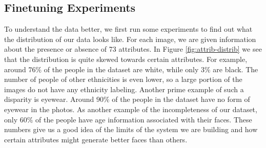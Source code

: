 \documentclass[10pt,twocolumn,letterpaper]{article}
\begin{document}
\subsection{Finetuning Experiments}
To understand the data better, we first run some experiments to find out what the distribution of our data looks like. For each image, we are given information about the presence or absence of 73 attributes. In Figure \ref{fig:attrib-distrib} we see that the distribution is quite skewed towards certain attributes. For example, around $76\%$ of the people in the dataset are white, while only $3\%$ are black. The number of people of other ethnicities is even lower, so a large portion of the images do not have any ethnicity labeling. Another prime example of such a disparity is eyewear. Around $90\%$ of the people in the dataset have no form of eyewear in the photos. As another example of the incompleteness of our dataset, only $60\%$ of the people have age information associated with their faces. These numbers give us a good idea of the limits of the system we are building and how certain attributes might generate better faces than others. 
\end{document}
